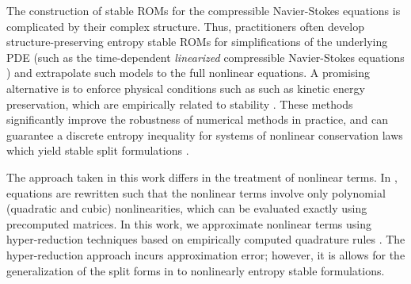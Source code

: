 \documentclass[review]{siamart171218}
\theoremstyle{assumption}
\begin{document}
The construction of stable ROMs for the compressible Navier-Stokes equations is complicated by their complex structure.  Thus, practitioners often develop structure-preserving entropy stable ROMs for simplifications of the underlying PDE (such as the time-dependent \textit{linearized} compressible Navier-Stokes equations \cite{barone2009stable, kalashnikova2010stability, serre2012reliable, amsallem2012stabilization, kalashnikova2014construction}) and extrapolate such models to the full nonlinear equations.  A promising alternative is to enforce physical conditions such as such as kinetic energy preservation, which are empirically related to stability \cite{maboudi2018conservative}.  These methods significantly improve the robustness of numerical methods in practice, and can guarantee a discrete entropy inequality for systems of nonlinear conservation laws which yield stable split formulations \cite{fisher2013discretely}.  

The approach taken in this work differs in the treatment of nonlinear terms.  In \cite{maboudi2018conservative}, equations are rewritten such that the nonlinear terms involve only polynomial (quadratic and cubic) nonlinearities, which can be evaluated exactly using precomputed matrices.  In this work, we approximate nonlinear terms using hyper-reduction techniques based on empirically computed quadrature rules \cite{an2008optimizing, hernandez2017dimensional}.  The hyper-reduction approach incurs approximation error; however, it is allows for the generalization of the split forms in \cite{maboudi2018conservative} to nonlinearly entropy stable formulations.

%
%
\end{document}
